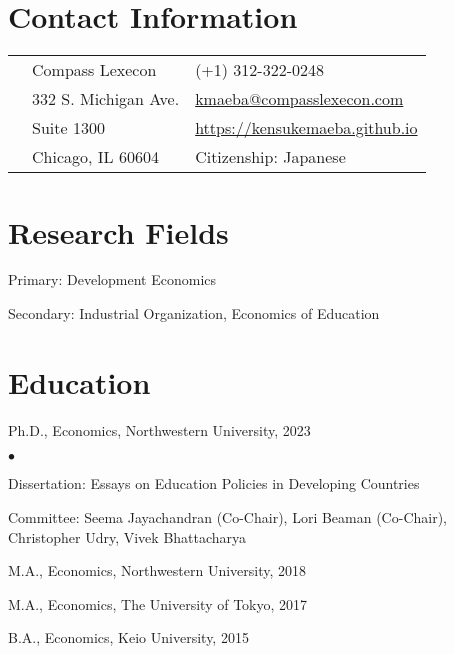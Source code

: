 \documentclass[margin,line]{res}
\makeatletter
\newenvironment{list1}{
  \begin{list}{\ding{113}}{%
      \setlength{\itemsep}{.025in}
      \setlength{\parsep}{0in} \setlength{\parskip}{0in}
      \setlength{\topsep}{0in} \setlength{\partopsep}{0in}
      \setlength{\leftmargin}{0.17in}}}{\end{list}}
\newenvironment{list2}{
  \begin{list}{$\bullet$}{%
      \setlength{\itemsep}{0in}
      \setlength{\parsep}{0in} \setlength{\parskip}{0in}
      \setlength{\topsep}{0in} \setlength{\partopsep}{0in}
      \setlength{\leftmargin}{0.2in}}}{\end{list}}
\renewcommand{\name}[1]{%
  \def\@name{%
    \begin{tabular*}{\textwidth}{@{\extracolsep{\fill}} lr}
      #1 & {\small \color{gray} Last updated: \mydate\today}
    \end{tabular*}%
  }%
}
\makeatother
\begin{document}

~\\
~\\
\name{ {\LARGE Kensuke Maeba} \vspace*{.1in}}

\begin{resume}
\thispagestyle{plain} %

\section{Contact Information}
\vspace{.05in}
\begin{tabular}{@{}p{0.20in}p{2.75in}p{2.75in}}
 & Compass Lexecon           & (+1) 312-322-0248 \\
 & 332 S. Michigan Ave.  &  \href{mailto: kmaeba@compasslexecon.com}{kmaeba@compasslexecon.com} \\
 & Suite 1300 &  \href{https://kensukemaeba.github.io}{https://kensukemaeba.github.io}\\
 & Chicago, IL 60604  & Citizenship: Japanese
\end{tabular}

\section{Research Fields}
\begin{list1}
\item[] Primary: Development Economics
\item[] Secondary: Industrial Organization, Economics of Education
\vspace*{.05in}
\end{list1}

\section{ Education}\begin{tiny}

\end{tiny}
\begin{list1}
\item[] Ph.D., Economics, Northwestern University, 2023
	\begin{list2}
		\item[] Dissertation: Essays on Education Policies in Developing Countries
		\item[] Committee: Seema Jayachandran (Co-Chair), Lori Beaman (Co-Chair), Christopher Udry, Vivek Bhattacharya
	\end{list2}
\item[] M.A., Economics, Northwestern University, 2018
\item[] M.A., Economics, The University of Tokyo, 2017
\item[] B.A., Economics, Keio University, 2015
\end{list1}


\end{resume}
\end{document}
